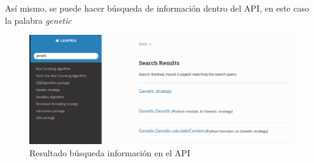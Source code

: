 Así mismo, se puede hacer búsqueda de información dentro del API, en este caso la palabra \textit{genetic}

\begin{figure}[H]
    \centering
    \includegraphics[scale=0.45]{Capitulo7Libreria/imagenes/lamfriaC.png}
    \caption{Resultado búsqueda información en el API}
    \label{fig:lamfriaC}
\end{figure}